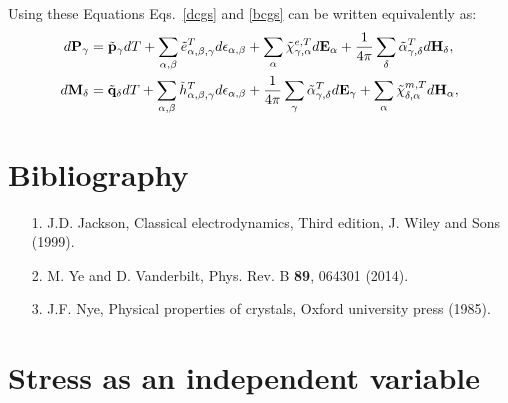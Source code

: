 \documentclass[12pt,a4paper,twoside]{report}
\begin{document}
{Using these Equations Eqs.~\ref{dcgs} and \ref{bcgs} can be written
equivalently as:
\begin{align}
d{\bf P}_\gamma&=
\tilde {\bf p}_\gamma dT + \sum_{\alpha,\beta} \tilde 
e^T_{\alpha,\beta,\gamma} d\epsilon_{\alpha,\beta}
+ \sum_\alpha \tilde \chi^{e,T}_{\gamma,\alpha} 
d{\bf E}_{\alpha} + {1\over 4 \pi}
\sum_\delta \tilde \alpha^T_{\gamma,\delta} d{\bf H}_{\delta}, \\
d{\bf M}_\delta&= \tilde {\bf q}_\delta dT+ \sum_{\alpha,\beta}
\tilde h^T_{\alpha,\beta,\gamma}
d\epsilon_{\alpha,\beta}
+{1\over 4 \pi} \sum_\gamma \tilde \alpha^T_{\gamma,\delta}
d{\bf E}_{\gamma}+ 
\sum_\alpha \tilde \chi^{m,T}_{\delta,\alpha}
d{\bf H}_{\alpha}, 
\end{align}
}

\newpage
{\color{dark-blue}\chapter{Bibliography}}
\color{black}

\begin{enumerate}

\item
[1.] J.D. Jackson, Classical electrodynamics, Third edition,
J. Wiley and Sons (1999).

\item
[2.] M. Ye and D. Vanderbilt, Phys. Rev. B {\bf 89}, 064301 (2014).

\item[3.] J.F. Nye, Physical properties of crystals, Oxford university 
press (1985).
\end{enumerate}


\appendix
{\color{dark-blue}\chapter{Stress as an independent variable}}
\color{black}
\end{document}
